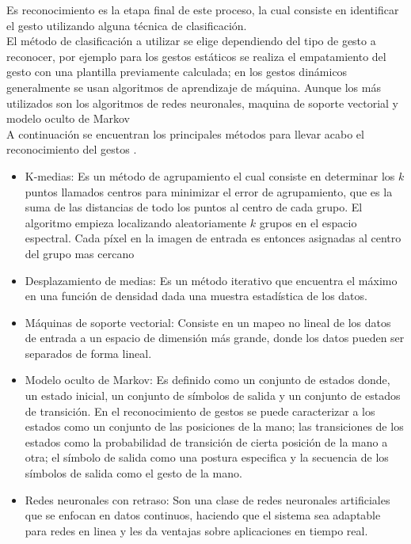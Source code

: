 Es reconocimiento es la etapa final de este proceso, la cual consiste en identificar el gesto utilizando alguna técnica de clasificación.\\
El método de clasificación a utilizar se elige dependiendo del tipo de gesto a reconocer, por ejemplo para los gestos estáticos se realiza el empatamiento del gesto con una plantilla previamente calculada; en los gestos dinámicos generalmente  se usan algoritmos de aprendizaje de máquina. Aunque los más utilizados son los algoritmos de redes neuronales, maquina de soporte vectorial y modelo oculto de Markov\\ 
A continuación se encuentran los principales métodos para llevar acabo el reconocimiento del gestos \citep{Rautaray2012}. 
\begin{itemize}
	\item K-medias: Es un método de agrupamiento el cual consiste en determinar los $k$ puntos llamados centros para minimizar el error de agrupamiento, que es la suma de las distancias de todo los puntos al centro de cada grupo. El algoritmo empieza localizando aleatoriamente $k$ grupos en el espacio espectral. Cada p\'ixel en la imagen de entrada es entonces asignadas al centro del grupo mas cercano  
	\item Desplazamiento de medias: Es un método iterativo que encuentra el máximo en una función de densidad dada una muestra estadística de los datos.
	\item Máquinas de soporte vectorial: Consiste en un mapeo no lineal de los datos de entrada a un espacio de dimensi\'on m\'as grande, donde los datos pueden ser separados de forma lineal.  
	\item Modelo oculto de Markov: Es definido como un conjunto de estados donde, un estado inicial, un conjunto de símbolos de salida y un conjunto de estados de transición. En el reconocimiento de gestos se puede caracterizar a    los estados como un conjunto de las posiciones de la mano; las  transiciones de los estados como la probabilidad de transición de cierta posición de la mano a otra; el símbolo de salida como una postura especifica y la secuencia de los símbolos de salida como  el gesto de la mano.   
	\item Redes neuronales con retraso: Son una clase de redes neuronales artificiales que se enfocan en datos continuos, haciendo que el sistema sea adaptable para redes en linea y les da ventajas sobre aplicaciones en tiempo real. 
\end{itemize}  



